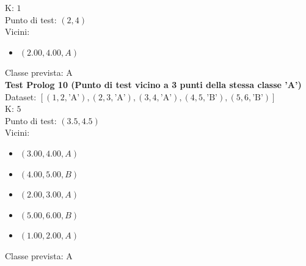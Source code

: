 \documentclass[11pt]{article}
\theoremstyle{definition}
\begin{document}
K: $1$\\
Punto di test: $(2, 4)$\\
Vicini:
\begin{itemize}
\item $(2.00,4.00, A)$
\end{itemize}
Classe prevista: A\\
\newline
\textbf{Test Prolog 10 (Punto di test vicino a 3 punti della stessa classe 'A')}\\
Dataset: $[(1, 2, \text{'A'}), (2, 3, \text{'A'}), (3, 4, \text{'A'}), (4, 5, \text{'B'}), (5, 6, \text{'B'})]$\\
K: $5$\\
Punto di test: $(3.5, 4.5)$\\
Vicini:
\begin{itemize}
\item $(3.00,4.00,A)$
\item $(4.00,5.00,B)$
\item $(2.00,3.00,A)$
\item $(5.00,6.00,B)$
\item $(1.00,2.00,A)$
\end{itemize}
Classe prevista: A
\end{document}
